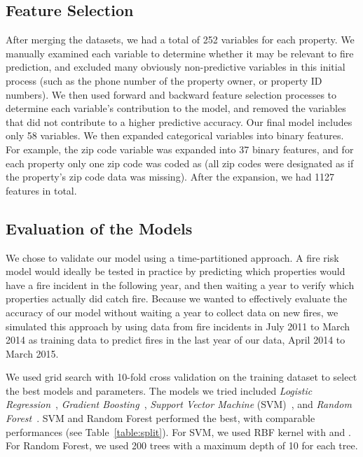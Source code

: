 \documentclass{sig-alternate-05-2015}
\begin{document}
{\subsection{Feature Selection}
After merging the datasets, we had a total of 252 variables for each property. We manually examined each variable to determine whether it may be relevant to fire prediction, and excluded many obviously non-predictive variables in this initial process (such as the phone number of the property owner, or property ID numbers). 
We then used forward and backward feature selection processes to determine each variable's contribution to the model, and removed the variables that did not contribute to a higher predictive accuracy. Our final model includes only 58 variables. We then expanded categorical variables into binary features. For example, the zip code variable was expanded into 37 binary features, and for each property only one zip code was coded as  (all zip codes were designated as  if the property's zip code data was missing). After the expansion, we had 1127 features in total.


\subsection{Evaluation of the Models}
\label{sec:evaluate}
We chose to validate our model using a time-partitioned approach. A fire risk model would ideally be tested in practice by predicting which properties would have a fire incident in the following year, and then waiting a year to verify which properties actually did catch fire. Because we wanted to effectively evaluate the accuracy of our model without waiting a year to collect data on new fires, we simulated this approach by using data from fire incidents in July 2011 to March 2014 as training data to predict fires in the last year of our data, April 2014 to March 2015.

We used grid search with 10-fold cross validation on the training dataset to select the best models and parameters.
The models we tried included \textit{Logistic Regression}~\cite{nelder1972generalized}, \textit{Gradient Boosting}~\cite{friedman2002stochastic}, \textit{Support Vector Machine} (SVM)~\cite{cortes1995support}, and \textit{Random Forest}~\cite{breiman2001random}. 
SVM and Random Forest performed the best,
with comparable performances (see Table~\ref{table:split}). For SVM, we used RBF kernel with  and . For Random Forest, we used 200 trees with a maximum depth of 10 for each tree.

}
\end{document}
